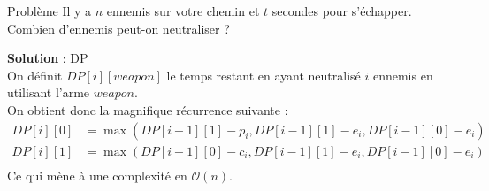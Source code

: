 \begin{frame}
    \frametitle{\problemtitle}
        \begin{block}
            {Problème} Il y a $n$ ennemis sur votre chemin et $t$ secondes pour s'échapper. Combien d'ennemis peut-on neutraliser ?
        \end{block}
        \pause
        \textbf{Solution} : DP \\
        \pause
        On définit $DP[i][weapon]$ le temps restant en ayant neutralisé $i$ ennemis en utilisant l'arme $weapon$.\\
        \pause
        On obtient donc la magnifique récurrence suivante :\\
        \begin{align*}
            DP[i][0] &= \max(DP[i-1][1] - p_i, DP[i-1][1] - e_i, DP[i-1][0] - e_i)\\
            DP[i][1] &= \max(DP[i-1][0] - c_i, DP[i-1][1] - e_i, DP[i-1][0] - e_i)\\
        \end{align*}
        Ce qui mène à une complexité en $\mathcal O(n)$.
\end{frame}
